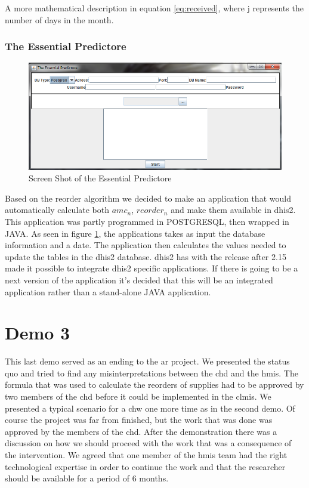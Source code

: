 A more mathematical description in equation \ref{eq:received}, where j represents the number of days in the month.

\subsubsection{The Essential Predictore}

\begin{figure}
\centering
\includegraphics[width=\textwidth]{case/img/essentialPredictoreScreenShot}
\caption{Screen Shot of the Essential Predictore}
\label{fig:essPred}
\end{figure}

Based on the reorder algorithm we decided to make an application that would automatically calculate both $amc_{n}$, $reorder_{n}$ and make them available in \gls{dhis2}. This application was partly programmed in POSTGRESQL, then wrapped in JAVA. 
As seen in figure \ref{fig:essPred}, the applications takes as input the database information and a date. 
The application then calculates the values needed to update the tables in the \gls{dhis2} database. 
\gls{dhis2} has with the release after 2.15 made it possible to integrate \gls{dhis2} specific applications. 
If there is going to be a next version of the application it's decided that this will be an integrated application rather than a stand-alone JAVA application. 

\section{Demo 3}
This last demo served as an ending to the \gls{ar} project.
We presented the status quo and tried to find any misinterpretations between the \gls{chd} and the \gls{hmis}.
The formula that was used to calculate the reorders of supplies had to be approved by two members of the \gls{chd} before it could be implemented in the \gls{clmis}. 
We presented a typical scenario for a \gls{chw} one more time as in the second demo.
Of course the project was far from finished, but the work that was done was approved by the members of the \gls{chd}.
After the demonstration there was a discussion on how we should proceed with the work that was a consequence of the intervention.
We agreed that one member of the \gls{hmis} team had the right technological expertise in order to continue the work and that the researcher should be available for a period of 6 months.


